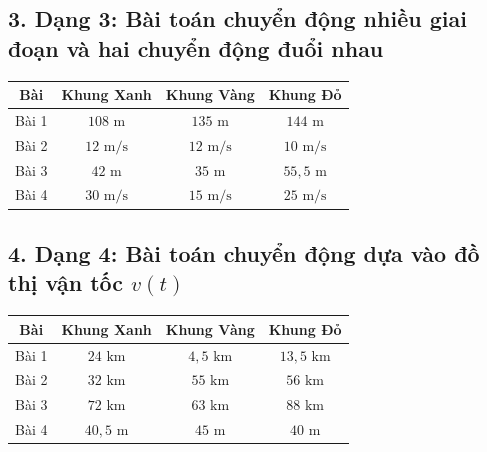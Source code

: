 \documentclass[12pt]{article}
\begin{document}
\subsection*{3. Dạng 3: Bài toán chuyển động nhiều giai đoạn và hai chuyển động đuổi nhau}
\begin{center}
	\begin{tabular}{|c|c|c|c|}
		\hline
		\textbf{Bài} & \textbf{Khung Xanh} & \textbf{Khung Vàng} & \textbf{Khung Đỏ} \\
		\hline
		Bài 1 & $108\text{ m}$ & $135\text{ m}$ & $144\text{ m}$ \\
		\hline
		Bài 2 & $12\text{ m/s}$ & $12\text{ m/s}$ & $10\text{ m/s}$ \\
		\hline
		Bài 3 & $42\text{ m}$ & $35\text{ m}$ & $55{,}5\text{ m}$ \\
		\hline
		Bài 4 & $30\text{ m/s}$ & $15\text{ m/s}$ & $25\text{ m/s}$ \\
		\hline
	\end{tabular}
\end{center}

\subsection*{4. Dạng 4: Bài toán chuyển động dựa vào đồ thị vận tốc $v(t)$}
\begin{center}
	\begin{tabular}{|c|c|c|c|}
		\hline
		\textbf{Bài} & \textbf{Khung Xanh} & \textbf{Khung Vàng} & \textbf{Khung Đỏ} \\
		\hline
		Bài 1 & $24\text{ km}$ & $4{,}5\text{ km}$ & $13{,}5\text{ km}$ \\
		\hline
		Bài 2 & $32\text{ km}$ & $55\text{ km}$ & $56\text{ km}$ \\
		\hline
		Bài 3 & $72\text{ km}$ & $63\text{ km}$ & $88\text{ km}$ \\
		\hline
		Bài 4 & $40{,}5\text{ m}$ & $45\text{ m}$ & $40\text{ m}$ \\
		\hline
	\end{tabular}
\end{center}
\end{document}
